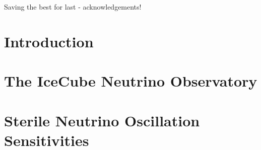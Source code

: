 \documentclass[
11pt, 
english, 
doublespacing, %
headsepline, %
usenames,dvipsnames
]{dissertation_class} %
\numberwithin{figure}{section}
\numberwithin{table}{section}
\numberwithin{equation}{section}
\begin{document}
\begin{acknowledgements}
    \addchaptertocentry{\acknowledgementname} %
    Saving the best for last - acknowledgements! 
    \iffalse
    I would also like to acknowledge the UTA Office of Information Technology, whose countless hours spent breaking their own network, designing failure as a feature, ignoring open tickets on their own ticketing system, seeding their contact pages with fake contact information, organizing demonstrations of their vast and incalculable incompetence, and attempting to steal and sabotage my work laptop were ultimately, and thankfully, a fruitless endeavor. Without their tiresome efforts I surely would have finished a year sooner than I did. 

    By some miracle, this dissertation was turned in on time. 
    But rather than by some kind of divine intervention, it was because of the collected efforts and support of dozens of people over the five or so years it took to write. 
    Without them either this dissertation wouldn't exist, or you might instead have found yourself reading about Dune (not the fun one). 

    I would like need to thank Leslie Rogers and Nick Byrnes for getting me to joint the nuRES group to begin with and getting me started on this path, Grant Parker for
    
    Austin Schneider and Carlos Arg{\"u}elles for teaching me the IceCube ropes. 

    My parents for getting me started in physics to begin with. 

    Bruce Schumm 

    \fi 


\end{acknowledgements}

\tableofcontents


\chapter{Introduction}\label{chapter:intro}



\chapter{The IceCube Neutrino Observatory}\label{chapter:icecube}



\chapter{Sterile Neutrino Oscillation Sensitivities}\label{chapter:sense}

\end{document}
